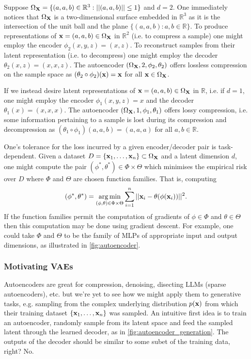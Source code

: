 \documentclass[11pt]{article}
\begin{document}
\begin{example}
    \label{ex:autoencoder}
    Suppose $\Omega_{\mathbf{X}}=\{(a,a,b)\in\mathbb{R}^3:||(a,a,b)||\leq1\}$ and $d=2$. One immediately notices that $\Omega_{\mathbf{X}}$ is a two-dimensional surface embedded in $\mathbb{R}^3$ as it is the intersection of the unit ball and the plane $\{(a,a,b):a,b\in\mathbb{R}\}$. To produce representations of $\mathbf{x}=(a,a,b)\in\Omega_{\mathbf{X}}$ in $\mathbb{R}^2$ (i.e. to compress a sample) one might employ the encoder $\phi_2(x,y,z)=(x,z)$. To reconstruct samples from their latent representation (i.e. to decompress) one might employ the decoder $\theta_2(x,z)=(x,x,z)$. The autoencoder $(\Omega_{\mathbf{X}},2,\phi_2,\theta_2)$ offers lossless compression on the sample space as $(\theta_2\circ\phi_2)(\mathbf{x})=\mathbf{x}$ for all $\mathbf{x}\in\Omega_{\mathbf{X}}$.
    
    \hspace{15pt} If we instead desire latent representations of $\mathbf{x}=(a,a,b)\in\Omega_{\mathbf{X}}$ in $\mathbb{R}$, i.e. if $d=1$, one might employ the encoder $\phi_1(x,y,z)=x$ and the decoder $\theta_1(x)=(x,x,x)$. The autoencoder $(\Omega_{\mathbf{X}},1,\phi_1,\theta_1)$ offers lossy compression, i.e. some information pertaining to a sample is lost during its compression and decompression as $(\theta_1\circ\phi_1)(a,a,b)=(a,a,a)$ for all $a,b\in\mathbb{R}$.
\end{example}

One's tolerance for the loss incurred by a given encoder/decoder pair is task-dependent. Given a dataset $D=\{\mathbf{x}_1,\dots,\mathbf{x}_n\}\subset\Omega_{\mathbf{X}}$ and a latent dimension $d$, one might compute the pair $(\phi^*,\theta^*)\in\Phi\times\Theta$ which minimises the empirical risk over $D$ where $\Phi$ and $\Theta$ are chosen function families. That is, computing
$$
(\phi^*,\theta^*)
=
\operatorname*{arg\,min}_{(\phi,\theta)\in\Phi\times\Theta}
\sum_{i=1}^n||\mathbf{x}_i-\theta(\phi(\mathbf{x}_i))||^2.
$$
If the function families permit the computation of gradients of $\phi\in\Phi$ and $\theta\in\Theta$ then this computation may be done using gradient descent. For example, one could take $\Phi$ and $\Theta$ to be the family of MLPs of appropriate input and output dimensions, as illustrated in \autoref{fig:autoencoder}.

\subsubsection{Motivating VAEs}
Autoencoders are great for compression, denoising, disecting LLMs (sparse autoencoders), etc. but we're yet to see how we might apply them to generative tasks, e.g. sampling from the complex underlying distribution $p(\mathbf{x})$ from which their training dataset $\{\mathbf{x}_1,\dots,\mathbf{x}_n\}$ was sampled. An intuitive first idea is to train an autoencoder, randomly sample from its latent space and feed the sampled latent through the learned decoder, as in \autoref{fig:autoencoder_generation}. The outputs of the decoder should be similar to some subet of the training data, right? No.
\end{document}
